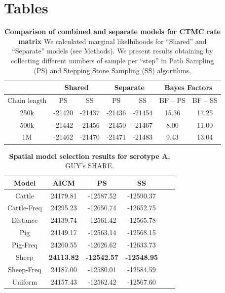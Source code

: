 \documentclass[10pt]{article}
\begin{document}
\section*{Tables}
\begin{table}[!ht]
\caption{{\bf Comparison of combined and separate models for CTMC rate matrix} We calculated marginal likelhihoods for ``Shared'' and ``Separate'' models (see Methods). We present results obtaining by collecting different numbers of sample per ``step'' in Path Sampling (PS) and Stepping Stone Sampling (SS) algorithms.}
 \begin{center}
 \begin{tabular}{ccccccc}
 \toprule
 &\multicolumn{2}{c}{Shared}& \multicolumn{2}{c}{Separate} & \multicolumn{2}{c}{Bayes Factors}\\
 \midrule
Chain length&PS&SS&PS&SS&BF -- PS&BF -- SS\\
250k&-21420&-21437&-21436&-21454&15.36&17.25\\
500k&-21442&-21456&-21450&-21467&8.00&11.00\\
1M&-21462&-21470&-21471&-21483&9.43&13.04\\
\bottomrule
 \end{tabular}
 \end{center}
 \begin{flushleft}
\end{flushleft}
\label{tab:sharedsep}
\end{table}
\begin{table}[!ht]
\caption{
\textbf{Spatial model selection results for serotype A. } GUY's SHARE.}
\begin{center}
\begin{tabular}{cccccc}
\toprule
Model & AICM  & PS    & SS\\
\midrule
Cattle	&24179.81	&-12587.52	&-12590.37\\
Cattle-Freq	&24295.23	&-12650.74	&-12652.75\\
Distance	&24139.74	&-12561.42	&-12565.78\\
Pig	&24149.17	&-12563.14	&-12568.15\\
Pig-Freq	&24260.55	&-12626.62	&-12633.73\\
Sheep	& {{ \bf 24113.82}}	& {{\bf -12542.57}}	& {{\bf -12548.95}}\\
Sheep-Freq	&24187.00	&-12580.01	&-12584.59\\
Uniform	&24157.43	&-12562.42	&-12567.60\\
\bottomrule
\end{tabular}
\end{center}
\begin{flushleft}
\end{flushleft}
\label{tab:predA}
 \end{table}
\end{document}
